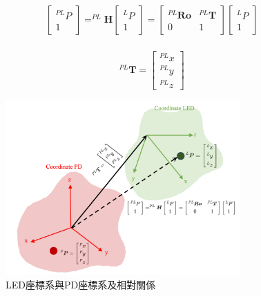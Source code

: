     \begin{equation}
    \label{eqn:homogeneous}
    \begin{gathered}
        \left[
        \begin{array}{c}
            ^{PL}P \\1
        \end{array}\right]
        =^{PL}\boldsymbol{H}
        \left[
        \begin{array}{c}
        ^{L}P \\ 1
        \end{array}\right] =\left[
        \begin{array}{cc}
        ^{PL}\boldsymbol{Ro} & ^{PL}\boldsymbol{T} \\
        0 & 1
        \end{array}\right]\left[
        \begin{array}{c}
        ^{L}P \\ 1
        \end{array}\right] \\
    \end{gathered}
    \end{equation}

    \begin{equation}
        ^{PL}\boldsymbol{T}=\left[\begin{array}{l}
        ^{PL}x \\ ^{PL}y \\ ^{PL}z
        \end{array}\right]
    \end{equation}

    \begin{figure}[ht]
        \centering
        \includegraphics[width=9cm]{ch2pic/homo_trans.png}
        \caption{LED座標系與PD座標系及相對關係}
        \label{pic:homo_trans}
    \end{figure}
    
